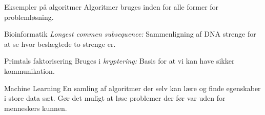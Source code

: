 \documentclass[12pt,t]{beamer}
\begin{document}
    \begin{frame}[t]{Eksempler på algoritmer}
        Algoritmer bruges inden for alle former for problemløsning. \pause
        \begin{block}{Bioinformatik}
            \emph{Longest commen subsequence: } Sammenligning af DNA strenge
            for at se hvor beslægtede to strenge er. \pause
        \end{block}
        \begin{block}{Primtals faktorisering}
            Bruges i \emph{kryptering: } Basis for at vi kan have sikker
            kommunikation. \pause
        \end{block}

        \begin{block}{Machine Learning}
            En samling af algoritmer der selv kan lære og finde egenskaber
            i store data sæt. Gør det muligt at løse problemer der før var
            uden for menneskers kunnen.
        \end{block}
    \end{frame}

\end{document}
